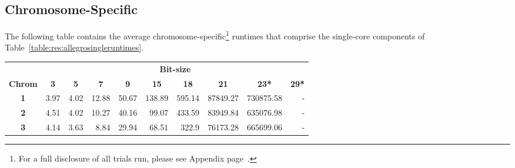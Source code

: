 \subsection{Chromosome-Specific}

The following table contains the average chromosome-specific\footnote{For a full disclosure of all trials run, please see Appendix page~\pageref{ref:app:singlecoreindiv}.} runtimes that comprise the single-core components of Table~\ref{table:res:allegrosingleruntimes}.

\begin{table}[h]
\begin{center}
\begin{tabular}{crrrrrrrrr}\toprule
\multicolumn{1}{l}{}               & \multicolumn{9}{c}{\textbf{Bit-size}}                                                                                                                                                                                                                                                                         \\
\multicolumn{1}{l}{\textbf{Chrom}} & \multicolumn{1}{c}{\textbf{3}} & \multicolumn{1}{c}{\textbf{5}} & \multicolumn{1}{c}{\textbf{7}} & \multicolumn{1}{c}{\textbf{9}} & \multicolumn{1}{c}{\textbf{15}} & \multicolumn{1}{c}{\textbf{18}} & \multicolumn{1}{c}{\textbf{21}} & \multicolumn{1}{c}{\textbf{23*}} & \multicolumn{1}{c}{\textbf{29*}} \\
\midrule
\textbf{1}                         & 3.97                           & 4.02                           & 12.88                          & 50.67                          & 138.89                          & 595.14                          & 87849.27                        & 730875.58                        & -                                \\
\textbf{2}                         & 4.51                           & 4.02                           & 10.27                      & 40.16                          & 99.07                           & 433.59                          & 83949.84                        & 635076.98                        & -                                \\
\textbf{3}                         & 4.14                           & 3.63                          & 8.84                       & 29.94                          & 68.51                           & 322.9                           & 76173.28                        & 665699.06                        & -                                \\

\end{tabular}
\end{center}
\end{table}
